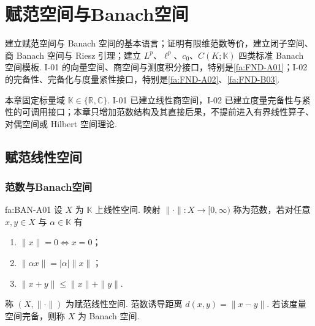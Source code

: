 \chapter{赋范空间与Banach空间}\label{chap:I-03}
\FAChapterOpening
{建立赋范空间与 Banach 空间的基本语言；证明有限维范数等价，建立闭子空间、商 Banach 空间与 Riesz 引理；建立 \(\displaystyle L^p\)、\(\displaystyle \ell^p\)、\(\displaystyle c_0\)、\(\displaystyle C(K;\mathbb K)\) 四类标准 Banach 空间模板.}
{I-01 的向量空间、商空间与测度积分接口，特别是\autoref{fa:FND-A01}；I-02 的完备性、完备化与度量紧性接口，特别是\autoref{fa:FND-A02}、\autoref{fa:FND-B03}.}
{\centering
{}}

本章固定标量域 \(\displaystyle \mathbb K\in\{\mathbb R,\mathbb C\}\). I-01 已建立线性商空间，I-02 已建立度量完备性与紧性的可调用接口；本章只增加范数结构及其直接后果，不提前进入有界线性算子、对偶空间或 Hilbert 空间理论.

\section{赋范线性空间}\label{sec:i03-normed}

\subsection{范数与Banach空间}

\begin{FADefinition}[A][赋范空间与Banach空间]{fa:BAN-A01}
设 \(\displaystyle X\) 为 \(\displaystyle \mathbb K\) 上线性空间. 映射 \(\displaystyle \|\cdot\|:X\to[0,\infty)\) 称为范数，若对任意 \(\displaystyle x,y\in X\) 与 \(\displaystyle \alpha\in\mathbb K\) 有
\begin{enumerate}[label=\textup{(\roman*)}]
\item \(\displaystyle \|x\|=0\Longleftrightarrow x=0\)；
\item \(\displaystyle \|\alpha x\|=|\alpha|\|x\|\)；
\item \(\displaystyle \|x+y\|\leqslant\|x\|+\|y\|\).
\end{enumerate}
称 \(\displaystyle (X,\|\cdot\|)\) 为赋范线性空间. 范数诱导距离 \(\displaystyle d(x,y)=\|x-y\|\).
若该度量空间完备，则称 \(\displaystyle X\) 为 Banach 空间.
\end{FADefinition}


